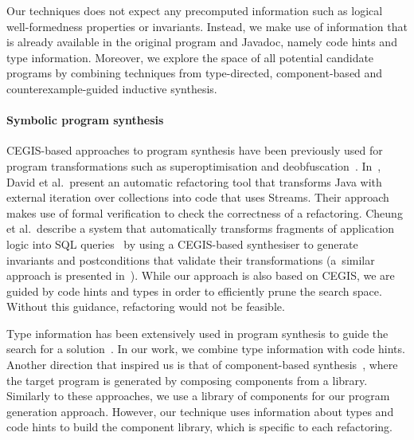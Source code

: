 \documentclass[conference]{IEEEtran}
\begin{document}
Our techniques does not expect any
precomputed information such as logical well-formedness properties or
invariants. Instead, we make use of information that is already
available in the original program and Javadoc, namely code hints and
type information. Moreover, we explore the space of all potential
candidate programs by combining techniques from type-directed,
component-based and counterexample-guided inductive synthesis.

\paragraph{Symbolic program synthesis}

CEGIS-based approaches to program synthesis have been previously used for
program transformations such as superoptimisation and
deobfuscation~\cite{DBLP:conf/icse/JhaGST10}. 
In~\cite{DBLP:journals/corr/abs-1712-07388}, David et al.~present an
automatic refactoring tool that transforms Java with external iteration over
collections into code that uses Streams.  Their approach makes use of formal
verification to check the correctness of a refactoring.  Cheung et
al.~describe a system that automatically transforms fragments of application
logic into SQL queries~\cite{DBLP:conf/pldi/CheungSM13} by using a
CEGIS-based synthesiser to generate invariants and postconditions that
validate their transformations (a~similar approach is presented
in~\cite{DBLP:conf/cc/IuCZ10}).  While our approach is also based on CEGIS,
we are guided by code hints and types in order to efficiently prune the
search space.  Without this guidance, refactoring would not be feasible.

%
Type information has been extensively used in program synthesis to guide the
search for a
solution~\cite{DBLP:conf/sfp/Katayama05,DBLP:conf/pldi/FeserCD15,DBLP:conf/pldi/OseraZ15,DBLP:journals/pacmpl/LubinCOC20,DBLP:journals/pacmpl/YamaguchiMDW21}. 
In our work, we combine type information with code hints.
%
%
%
Another direction that inspired us is that of component-based
synthesis~\cite{DBLP:conf/icse/JhaGST10,DBLP:conf/pldi/GulwaniJTV11,DBLP:conf/popl/FengM0DR17},
where the target program is generated by composing components from a
library.  Similarly to these approaches, we use a library of components for
our program generation approach.  However, our technique uses information
about types and code hints to build the component library, which is specific
to each refactoring.
\end{document}
